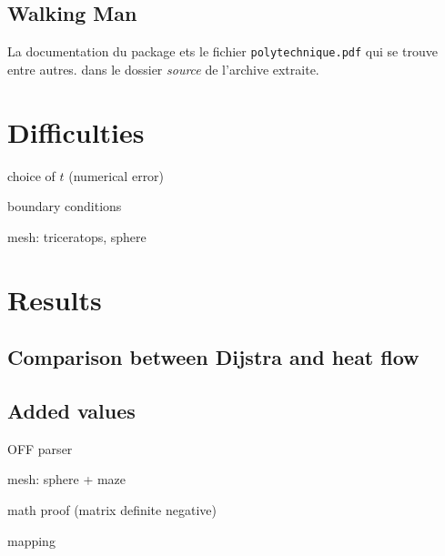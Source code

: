 \documentclass[a4paper,12pt,twoside]{article}
\begin{document}
\subsection{Walking Man}

La documentation du package ets le fichier \texttt{polytechnique.pdf} qui se trouve entre autres. dans le dossier \emph{source} de l'archive extraite.

\section{Difficulties}

choice of $t$ (numerical error)

boundary conditions

mesh: triceratops, sphere

\section{Results}

\subsection{Comparison between Dijstra and heat flow}

\subsection{Added values}
OFF parser

mesh: sphere + maze

math proof (matrix definite negative)

mapping
\end{document}
